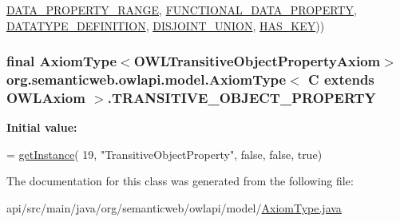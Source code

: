 \begin{DoxyCode}
                    \hyperlink{classorg_1_1semanticweb_1_1owlapi_1_1model_1_1_axiom_type_3_01_c_01extends_01_o_w_l_axiom_01_4_ac75d84c5b3938dd287c742cddda4c2ae}{DATA\_PROPERTY\_RANGE}, 
      \hyperlink{classorg_1_1semanticweb_1_1owlapi_1_1model_1_1_axiom_type_3_01_c_01extends_01_o_w_l_axiom_01_4_a9154630c212938c4032514e2d7dc85ed}{FUNCTIONAL\_DATA\_PROPERTY},
                    \hyperlink{classorg_1_1semanticweb_1_1owlapi_1_1model_1_1_axiom_type_3_01_c_01extends_01_o_w_l_axiom_01_4_a5cfd1765cc4f7993c790b4408092d5b6}{DATATYPE\_DEFINITION}, \hyperlink{classorg_1_1semanticweb_1_1owlapi_1_1model_1_1_axiom_type_3_01_c_01extends_01_o_w_l_axiom_01_4_a5919a9f01351959cb642d771dd945851}{DISJOINT\_UNION}, 
      \hyperlink{classorg_1_1semanticweb_1_1owlapi_1_1model_1_1_axiom_type_3_01_c_01extends_01_o_w_l_axiom_01_4_a411d5f796a4ea800677ad94299882497}{HAS\_KEY}))
\end{DoxyCode}
\hypertarget{classorg_1_1semanticweb_1_1owlapi_1_1model_1_1_axiom_type_3_01_c_01extends_01_o_w_l_axiom_01_4_af17f78607a0d961ddee1a718604ea02f}{
\subsubsection[{T\-R\-A\-N\-S\-I\-T\-I\-V\-E\-\_\-\-O\-B\-J\-E\-C\-T\-\_\-\-P\-R\-O\-P\-E\-R\-T\-Y}]{\setlength{\rightskip}{0pt plus 5cm}final {\bf Axiom\-Type}$<${\bf O\-W\-L\-Transitive\-Object\-Property\-Axiom}$>$ org.\-semanticweb.\-owlapi.\-model.\-Axiom\-Type$<$ C extends {\bf O\-W\-L\-Axiom} $>$.T\-R\-A\-N\-S\-I\-T\-I\-V\-E\-\_\-\-O\-B\-J\-E\-C\-T\-\_\-\-P\-R\-O\-P\-E\-R\-T\-Y\hspace{0.3cm}{\ttfamily [static]}}}\label{classorg_1_1semanticweb_1_1owlapi_1_1model_1_1_axiom_type_3_01_c_01extends_01_o_w_l_axiom_01_4_af17f78607a0d961ddee1a718604ea02f}
{\bfseries Initial value\-:}
\begin{DoxyCode}
= \hyperlink{classorg_1_1semanticweb_1_1owlapi_1_1model_1_1_axiom_type_3_01_c_01extends_01_o_w_l_axiom_01_4_a485e011845434c518471707a87f09339}{getInstance}(
            19, \textcolor{stringliteral}{"TransitiveObjectProperty"}, \textcolor{keyword}{false}, \textcolor{keyword}{false}, \textcolor{keyword}{true})
\end{DoxyCode}


The documentation for this class was generated from the following file\-:\begin{DoxyCompactItemize}
\item 
api/src/main/java/org/semanticweb/owlapi/model/\hyperlink{_axiom_type_8java}{Axiom\-Type.\-java}\end{DoxyCompactItemize}
